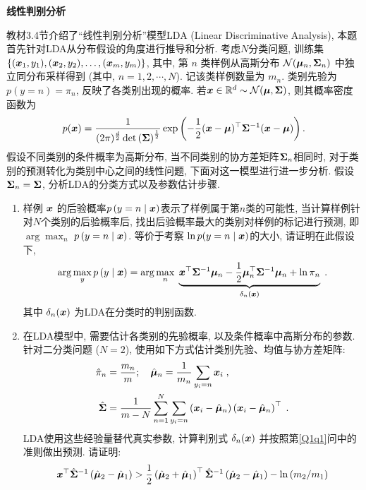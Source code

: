 \documentclass[answers]{exam}  %
\begin{document}
\begin{questions}
\question [20] \textbf{线性判别分析}

教材3.4节介绍了“线性判别分析”模型LDA (Linear Discriminative Analysis), 本题首先针对LDA从分布假设的角度进行推导和分析.
考虑$N$分类问题, 训练集 $\left\{({\boldsymbol{x}}_1,y_1),({\boldsymbol{x}}_2,y_2),\ldots,({\boldsymbol{x}}_m,y_m)\right\}$, 其中, 第 $n$ 类样例从高斯分布 $\mathcal{N}(\boldsymbol{\mu}_n,\boldsymbol{\Sigma}_n)$ 中独立同分布采样得到 (其中, $n=1,2,\cdots,N$). 记该类样例数量为 $m_n$. 类别先验为 $p\left(y=n\right)=\pi_n$, 反映了各类别出现的概率. 若${\boldsymbol{x}}\in \mathbb{R}^d \sim \mathcal{N}(\boldsymbol{\mu},\boldsymbol{\Sigma})$, 则其概率密度函数为
\begin{align}
	p({\boldsymbol{x}})=\frac{1}{(2\pi)^{\frac{d}{2}}\det\left(\boldsymbol{\Sigma}\right)^\frac{1}{2}}\exp\left(-\frac{1}{2}({\boldsymbol{x}}-\boldsymbol{\mu})^\top\boldsymbol{\Sigma}^{-1}({\boldsymbol{x}}-\boldsymbol{\mu})\right).
\end{align}
假设不同类别的条件概率为高斯分布, 当不同类别的协方差矩阵$\boldsymbol{\Sigma}_n$相同时, 对于类别的预测转化为类别中心之间的线性问题, %
下面对这一模型进行进一步分析.
假设$\boldsymbol{\Sigma}_n = \boldsymbol{\Sigma}$, 分析LDA的分类方式以及参数估计步骤.
\begin{enumerate}
	\item \label{Q1q1}样例 ${\boldsymbol{x}}$ 的后验概率$p\left(y=n\mid {\boldsymbol{x}}\right)$表示了样例属于第$n$类的可能性, 当计算样例针对$N$个类别的后验概率后, 找出后验概率最大的类别对样例的标记进行预测, 即 $\arg\max_n$ $p\left(y=n\mid {\boldsymbol{x}}\right)$. 等价于考察 $\ln p(y=n\mid {\boldsymbol{x}})$的大小,  请证明在此假设下, 
	\begin{equation}
	\arg\max_y p\left(y\mid {\boldsymbol{x}}\right)=\arg\max_n\; \underbrace{{\boldsymbol{x}}^{\top} \boldsymbol{\Sigma}^{-1} \boldsymbol{\mu}_{n}-\frac{1}{2} \boldsymbol{\mu}_{n}^{\top} \boldsymbol{\Sigma}^{-1} \boldsymbol{\mu}_{n}+\ln \pi_{n}}_{\delta_n({\boldsymbol{x}})}    \;.
	\end{equation}
	其中 $\delta_{n}({\boldsymbol{x}})$ 为LDA在分类时的判别函数. 
	\item \label{Q1q2} 在LDA模型中, 需要估计各类别的先验概率, 以及条件概率中高斯分布的参数. 针对二分类问题 ($N=2$), 使用如下方式估计类别先验、均值与协方差矩阵: 
	\begin{align}
	    \hat{\pi}_{n}&=\frac{m_n}{m}; \quad
	    \hat{\boldsymbol{\mu}}_{n}=\frac{1}{m_n}\sum_{y_{i}=n} {\boldsymbol{x}}_{i}\;,\\
	    \hat{\boldsymbol{\Sigma}}&=\frac{1}{m-N}\sum_{n=1}^{N} \sum_{y_{i}=n}\left({\boldsymbol{x}}_{i}-\hat{\boldsymbol{\mu}}_{n}\right)\left({\boldsymbol{x}}_{i}-\hat{\boldsymbol{\mu}}_{n}\right)^{\top}\;.
	\end{align}
	LDA使用这些经验量替代真实参数, 计算判别式 $\delta_n({\boldsymbol{x}})$ 并按照第\ref{Q1q1}问中的准则做出预测. 请证明:
	\begin{equation}
	    \vx^{\top} \hat{\mSigma}^{-1}\left(\hat{\vmu}_{2}-\hat{\vmu}_{1}\right)>\frac{1}{2}\left(\hat{\vmu}_{2}+\hat{\vmu}_{1}\right)^{\top} \hat{\mSigma}^{-1}\left(\hat{\vmu}_{2}-\hat{\vmu}_{1}\right)-\ln \left(m_{2} / m_{1}\right)

\end{equation}
\end{enumerate}
\end{questions}
\end{document}
